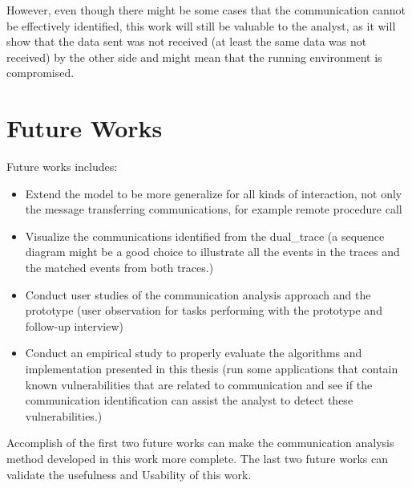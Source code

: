 However, even though there might be some cases that the communication cannot be effectively identified, this work will still be valuable to the analyst, as it will show that the data sent was not received (at least the same data was not received) by the other side and might mean that the running environment is compromised.

\section{Future Works}

Future works includes:
\begin{itemize}
\item Extend the model to be more generalize for all kinds of interaction, not only the message transferring communications, for example remote procedure call
\item Visualize the communications identified from the dual\_trace (a sequence diagram might be a good choice to illustrate all the events in the traces and the matched events from both traces.) 
\item Conduct user studies of the communication analysis approach and the prototype (user observation for tasks performing with the prototype and follow-up interview)
\item Conduct an empirical study to properly evaluate the algorithms and implementation presented in this thesis (run some applications that contain known vulnerabilities that are related to communication and see if the communication identification can assist the analyst to detect these vulnerabilities.)
\end{itemize}

Accomplish of the first two future works can make the communication analysis method developed in this work more complete. The last two future works can validate the usefulness and Usability of this work.


